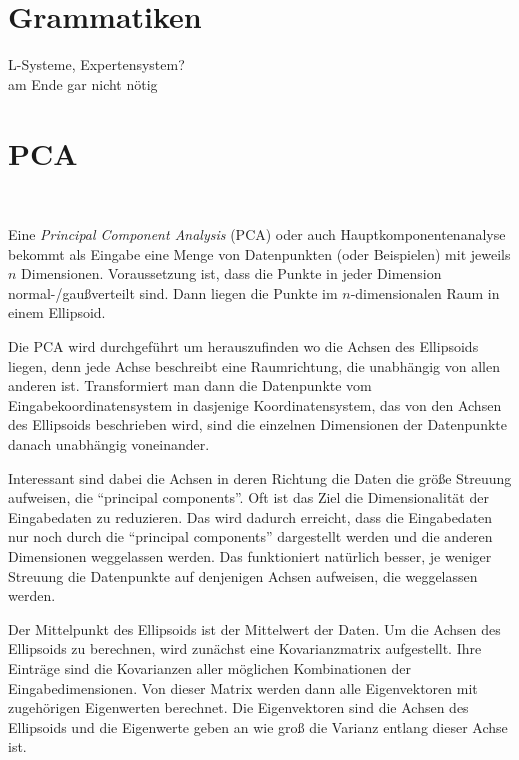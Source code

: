 \section{Grammatiken}

L-Systeme, Expertensystem?\\
am Ende gar nicht nötig


\section{PCA} %

 \\

 Eine \emph{Principal Component Analysis} (PCA) oder auch Hauptkomponentenanalyse bekommt als Eingabe eine Menge von Datenpunkten (oder Beispielen) mit jeweils $n$ Dimensionen. Voraussetzung ist, dass die Punkte in jeder Dimension normal-/gaußverteilt sind. Dann liegen die Punkte im $n$-dimensionalen Raum in einem Ellipsoid.
 
 Die PCA wird durchgeführt um herauszufinden wo die Achsen des Ellipsoids liegen, denn
 jede Achse beschreibt eine Raumrichtung, die unabhängig von allen anderen ist.
 Transformiert man dann die Datenpunkte vom Eingabekoordinatensystem in dasjenige Koordinatensystem, das von den Achsen des Ellipsoids beschrieben wird, sind die einzelnen Dimensionen der Datenpunkte danach unabhängig voneinander.
 
 Interessant sind dabei die Achsen in deren Richtung die Daten die größe Streuung aufweisen, die "`principal components"'. Oft ist das Ziel die Dimensionalität der Eingabedaten zu reduzieren. Das wird dadurch erreicht, dass die Eingabedaten nur noch durch die "`principal components"' dargestellt werden und die anderen Dimensionen weggelassen werden. Das funktioniert natürlich besser, je weniger Streuung die Datenpunkte auf denjenigen Achsen aufweisen, die weggelassen werden.
 
 Der Mittelpunkt des Ellipsoids ist der Mittelwert der Daten.
 Um die Achsen des Ellipsoids zu berechnen, wird zunächst eine Kovarianzmatrix aufgestellt. Ihre Einträge sind die Kovarianzen aller möglichen Kombinationen der Eingabedimensionen. Von dieser Matrix werden dann alle Eigenvektoren mit zugehörigen Eigenwerten berechnet.
 Die Eigenvektoren sind die Achsen des Ellipsoids und die Eigenwerte geben an wie groß die Varianz entlang dieser Achse ist.
 
